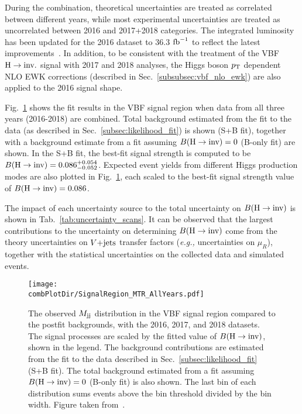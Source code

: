During the combination, theoretical uncertainties are treated as correlated between different years, while most experimental
uncertainties are treated as uncorrelated between 2016 and 2017+2018 categories.
The integrated luminosity has been updated for the 2016 dataset to 36.3 $\textrm{fb}^{-1}$ to reflect the latest
improvements~\cite{CMS:2021xjt}. In addition, to be consistent with the treatment of the VBF
$\textrm{H} \rightarrow \textrm{inv.}$ signal with 2017 and 2018 analyses, the Higgs boson $p_{\textrm{T}}$ dependent NLO EWK corrections 
(described in Sec.~\ref{subsubsec:vbf_nlo_ewk}) are also applied to the 2016 signal shape.

Fig.~\ref{fig:mtr_comb_with_2016} shows the fit results in the VBF signal region when data from all three years (2016-2018) 
are combined. Total background estimated from the fit to the data (as described in Sec.~\ref{subsec:likelihood_fit}) is shown (S+B fit),
together with a background estimate from a fit assuming ${{B}(\textrm{H}\rightarrow\text{inv})}=0$ (B-only fit) are shown. In the S+B fit, the best-fit signal strength is computed
to be ${{B}(\textrm{H}\rightarrow\text{inv})}=0.086^{+0.054}_{-0.052}$. Expected event yields from different Higgs production modes are also plotted in Fig.~\ref{fig:mtr_comb_with_2016}, 
each scaled to the best-fit signal strength value of ${{B}(\textrm{H}\rightarrow\text{inv})}=0.086$.

The impact of each uncertainty source to the total uncertainty on ${{B}(\textrm{H}\rightarrow\text{inv})}$ is shown in Tab.~\ref{tab:uncertainty_scans}. It can be observed that
the largest contributions to the uncertainty on determining ${{B}(\textrm{H}\rightarrow\text{inv})}$ come from the theory uncertainties on $V\text{+jets}$ transfer factors (\textit{e.g.,} uncertainties on $\mu_{R}$),
together with the statistical uncertainties on the collected data and simulated events.

\begin{figure}[htbp]
    \centering
    \texttt{[image: \\combPlotDir/SignalRegion\_MTR\_AllYears.pdf]}
    \caption{The observed $M_{\textrm{jj}}$ distribution in the VBF signal region compared to the postfit backgrounds, with the 
    2016, 2017, and 2018 datasets. The signal processes are scaled by the fitted value of ${{B}(\textrm{H}\rightarrow\text{inv})}$, shown in the legend. 
    The background contributions are estimated from 
    the fit to the data described in Sec.~\ref{subsec:likelihood_fit} (S+B fit). 
    The total background estimated from a fit assuming ${{B}(\textrm{H}\rightarrow\text{inv})}=0$ (B-only fit) is also shown. 
    The last bin of each distribution sums events above the bin threshold divided by the bin width. Figure taken from~\cite{VBFHinvAnalysisPaper}.}
    \label{fig:mtr_comb_with_2016}
\end{figure}

